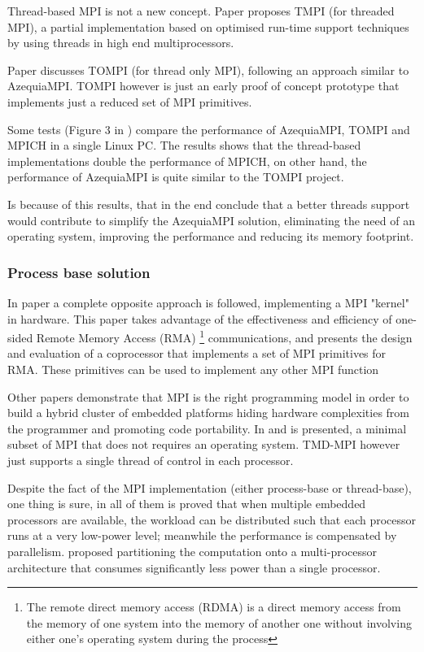 Thread-based MPI is not a new concept. Paper \cite{Tang} proposes TMPI (for
threaded MPI), a partial implementation based on optimised run-time support
techniques by using threads in high end multiprocessors. 

Paper \cite{Demaine} discusses TOMPI (for thread only MPI), following an
approach similar to AzequiaMPI. TOMPI however is just an early proof of concept
prototype that implements just a reduced set of MPI primitives. 

Some tests (Figure 3 in \cite{Gallego}) compare the performance of AzequiaMPI,
TOMPI and MPICH in a single Linux PC. The results shows that the thread-based
implementations double the performance of MPICH, on other hand, the performance
of AzequiaMPI is quite similar to the TOMPI project. 

Is because of this results,  that in the end \cite{Gallego} conclude that a better
threads support would contribute to simplify the AzequiaMPI solution,
eliminating the need of an operating system, improving the performance and
reducing its memory footprint. 


\subsubsection{Process base solution}

In paper \cite{Ziavrasa} a complete opposite approach is followed, implementing
a MPI "kernel" in hardware. This paper takes advantage of the effectiveness and
efficiency of one-sided Remote Memory Access (RMA)  \footnote{The remote direct
memory access (RDMA) is a direct memory access from the memory of one system
into the memory of another one without involving either one's operating system
during the process} communications, and presents the design and evaluation of a
coprocessor that implements a set of MPI primitives for RMA. These primitives
can be used to implement any other MPI function

Other papers \cite{Saldana-Chow} demonstrate that MPI is the right programming
model in order to build a hybrid cluster of embedded platforms  hiding hardware
complexities from the programmer and promoting code portability. In
\cite{Saldana-Chow} and \cite{Williams} is presented, a minimal subset of MPI
that does not requires an operating system. TMD-MPI however just supports a single thread of control in each  processor. 


Despite the fact of the MPI implementation (either process-base or
thread-base), one thing is sure, in all of them is proved that when multiple
embedded processors are available, the workload can be distributed such that
each processor runs at a very low-power level; meanwhile the performance is
compensated by parallelism.  \cite{Weglarz} proposed partitioning the
computation onto a multi-processor architecture that consumes significantly
less power than a single processor.  

